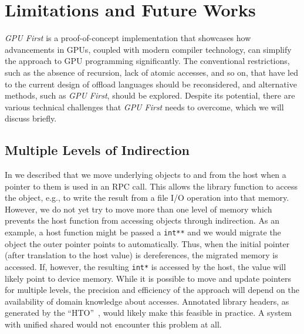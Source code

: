 \section{Limitations and Future Works}
\label{sec:limitations}

\emph{GPU First} is a proof-of-concept implementation that showcases how advancements in GPUs, coupled with modern compiler technology, can simplify the approach to GPU programming significantly.
The conventional restrictions, such as the absence of recursion, lack of atomic accesses, and so on, that have led to the current design of offload languages should be reconsidered, and alternative methods, such as \emph{GPU First}, should be explored.
Despite its potential, there are various technical challenges that \emph{GPU First} needs to overcome, which we will discuss briefly.


\subsection{Multiple Levels of Indirection}

In  we described that we move underlying objects to and from the host when a pointer to them is used in an RPC call.
This allows the library function to access the object, e.g., to write the result from a file I/O operation into that memory.
However, we do not yet try to move more than one level of memory which prevents the host function from accessing objects through indirection.
As an example, a host function might be passed a \lstinline|int**| and we would migrate the object the outer pointer points to automatically.
Thus, when the initial pointer (after translation to the host value) is dereferences, the migrated memory is accessed.
If, however, the resulting \lstinline|int*| is accessed by the host, the value will likely point to device memory.
While it is possible to move and update pointers for multiple levels, the precision and efficiency of the approach will depend on the availability of domain knowledge about accesses.
Annotated library headers, as generated by the ``HTO''~\cite{poster/MosesHTO}, would likely make this feasible in practice.
A system with unified shared would not encounter this problem at all.


